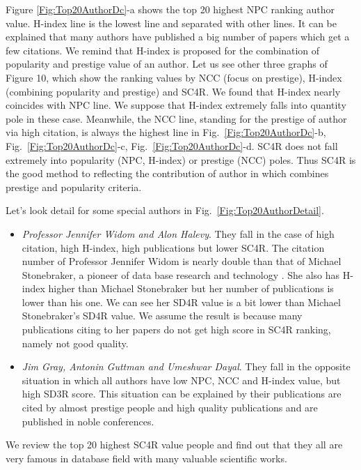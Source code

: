 \documentclass[10pt,leqno,twoside]{article}
\begin{document}
Figure \ref{Fig:Top20AuthorDc}-a shows the top 20 highest NPC ranking author value.  H-index line is the lowest line and separated with other lines. It can be explained that  many authors have published a big number of papers which get a few citations. We remind that H-index is proposed for the combination of popularity and prestige value of an author. Let us see other three graphs of Figure 10, which show the ranking values by NCC (focus on prestige), H-index (combining popularity and prestige) and SC4R. We found that H-index nearly coincides with NPC line. We suppose that H-index extremely falls into quantity pole in these case. Meanwhile, the NCC line, standing for the prestige of author via high citation, is always the highest line in Fig.~\ref{Fig:Top20AuthorDc}-b, Fig.~\ref{Fig:Top20AuthorDc}-c, Fig.~\ref{Fig:Top20AuthorDc}-d. SC4R does not fall extremely into popularity (NPC, H-index) or prestige (NCC) poles. Thus SC4R is the good method to reflecting the contribution of author in which combines prestige and popularity criteria. 

Let's look detail for some special authors in Fig.~\ref{Fig:Top20AuthorDetail}. 

\begin{itemize}
\item \textit{Professor Jennifer Widom and Alon Halevy}. They fall in the case of high citation, high H-index, high publications but lower SC4R. 
The citation number of Professor Jennifer Widom
is nearly double than that of Michael Stonebraker, a pioneer of data base research and technology %
. She also has H-index higher than Michael Stonebraker 
but her number of publications is lower than his one. We can see her SD4R value is a bit lower than Michael Stonebraker's SD4R value. We assume the result is because many publications citing to her papers do not get high score in SC4R ranking, namely not good quality.
\item \textit{Jim Gray, Antonin Guttman and Umeshwar Dayal}. They fall in the opposite situation in which all authors have low NPC, NCC and H-index value, but high SD3R score. This situation can be explained by their publications are cited by almost prestige people and high quality publications and are published in noble conferences.
\end{itemize}

We review the top 20 highest SC4R value people and find out that they all are very famous in database field with many valuable scientific works.
\end{document}
